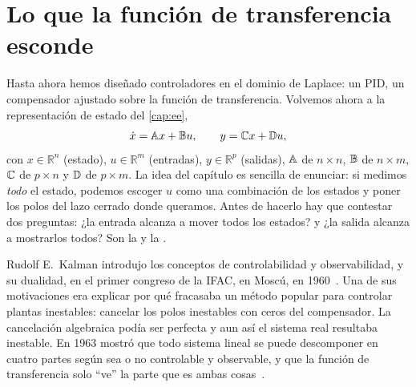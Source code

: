\section{Lo que la función de transferencia esconde}
\label{sec:re-kalman}

Hasta ahora hemos diseñado controladores en el dominio de Laplace: un PID, un compensador ajustado sobre la función de transferencia. Volvemos ahora a la representación de estado del \cref{cap:ee},
\begin{equation}
  \dot x=\mathbb{A} x+\mathbb{B} u,\qquad y=\mathbb{C} x+\mathbb{D} u,
  \label{eq:re-estado}
\end{equation}
con $x\in\mathbb{R}^n$ (estado), $u\in\mathbb{R}^m$ (entradas), $y\in\mathbb{R}^p$ (salidas), $\mathbb{A}$ de $n\times n$, $\mathbb{B}$ de $n\times m$, $\mathbb{C}$ de $p\times n$ y $\mathbb{D}$ de $p\times m$. La idea del capítulo es sencilla de enunciar: si medimos \emph{todo} el estado, podemos escoger $u$ como una combinación de los estados y poner los polos del lazo cerrado donde queramos. Antes de hacerlo hay que contestar dos preguntas: ¿la entrada alcanza a mover todos los estados? y ¿la salida alcanza a mostrarlos todos? Son la  y la .

\begin{historia}
Rudolf E.\ Kalman introdujo los conceptos de controlabilidad y observabilidad, y su dualidad, en el primer congreso de la IFAC, en Moscú, en 1960~\citep{Kal60}. Una de sus motivaciones era explicar por qué fracasaba un método popular para controlar plantas inestables: cancelar los polos inestables con ceros del compensador. La cancelación algebraica podía ser perfecta y aun así el sistema real resultaba inestable. En 1963 mostró que todo sistema lineal se puede descomponer en cuatro partes según sea o no controlable y observable, y que la función de transferencia solo ``ve'' la parte que es ambas cosas~\citep{Kal63}.
\end{historia}

